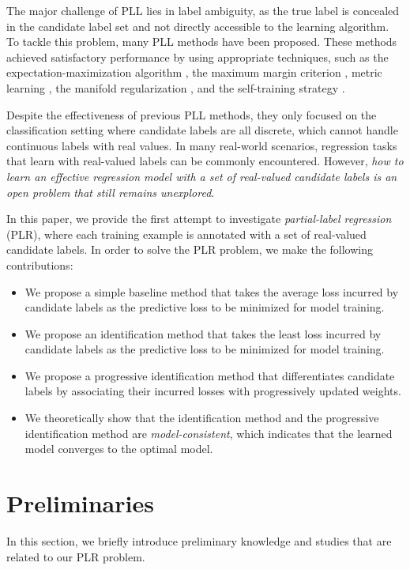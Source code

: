 \documentclass[letterpaper]{article} %
\begin{document}
The major challenge of PLL lies in label ambiguity, as the true label is concealed in the candidate label set and not directly accessible to the learning algorithm. To tackle this problem, many PLL methods have been proposed. These methods achieved satisfactory performance by using appropriate techniques, such as the expectation-maximization algorithm \cite{jin2003learning,wang2022pico}, the maximum margin criterion \cite{nguyen2008classification}, metric learning \cite{gong2021discriminative,liu2018metric}, the manifold regularization \cite{zhang2015solving,zhang2016partial,gong2018regularization,wang2019adaptive}, and the self-training strategy \cite{feng2019partial,lv2020progressive,feng2020provably,wen2021leveraged}.

Despite the effectiveness of previous PLL methods, they only focused on the classification setting where candidate labels are all discrete, which cannot handle continuous labels with real values. In many real-world scenarios, regression tasks that learn with real-valued labels can be commonly encountered.
However, \emph{how to learn an effective regression model with a set of real-valued candidate labels is an open problem that still remains unexplored}.

In this paper, we provide the first attempt to investigate \emph{partial-label regression} (PLR), where each training example is annotated with a set of real-valued candidate labels. In order to solve the PLR problem, we make the following contributions:
\begin{itemize}
\item We propose a simple baseline method that takes the average loss incurred by candidate labels as the predictive loss to be minimized for model training.
\item We propose an identification method that takes the least loss incurred by candidate labels as the predictive loss to be minimized for model training.
\item We propose a progressive identification method that differentiates candidate labels by associating their incurred losses with progressively updated weights.
\item We theoretically show that the identification method and the progressive identification method are \emph{model-consistent}, which indicates that the learned model converges to the optimal model.
\end{itemize}
\section{Preliminaries}
In this section, we briefly introduce preliminary knowledge and studies that are related to our PLR problem.
\end{document}
